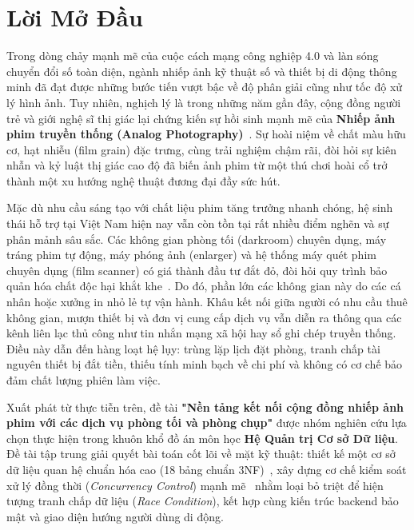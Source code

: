 \chapter*{Lời Mở Đầu}

Trong dòng chảy mạnh mẽ của cuộc cách mạng công nghiệp 4.0 và làn sóng chuyển đổi số toàn diện, ngành nhiếp ảnh kỹ thuật số và thiết bị di động thông minh đã đạt được những bước tiến vượt bậc về độ phân giải cũng như tốc độ xử lý hình ảnh. Tuy nhiên, nghịch lý là trong những năm gần đây, cộng đồng người trẻ và giới nghệ sĩ thị giác lại chứng kiến sự hồi sinh mạnh mẽ của \textbf{Nhiếp ảnh phim truyền thống (Analog Photography)}~\cite{edwards2023tactility}. Sự hoài niệm về chất màu hữu cơ, hạt nhiễu (film grain) đặc trưng, cùng trải nghiệm chậm rãi, đòi hỏi sự kiên nhẫn và kỷ luật thị giác cao độ đã biến ảnh phim từ một thú chơi hoài cổ trở thành một xu hướng nghệ thuật đương đại đầy sức hút.

Mặc dù nhu cầu sáng tạo với chất liệu phim tăng trưởng nhanh chóng, hệ sinh thái hỗ trợ tại Việt Nam hiện nay vẫn còn tồn tại rất nhiều điểm nghẽn và sự phân mảnh sâu sắc. Các không gian phòng tối (darkroom) chuyên dụng, máy tráng phim tự động, máy phóng ảnh (enlarger) và hệ thống máy quét phim chuyên dụng (film scanner) có giá thành đầu tư đắt đỏ, đòi hỏi quy trình bảo quản hóa chất độc hại khắt khe~\cite{rogers2023sustainable}. Do đó, phần lớn các không gian này do các cá nhân hoặc xưởng in nhỏ lẻ tự vận hành. Khâu kết nối giữa người có nhu cầu thuê không gian, mượn thiết bị và đơn vị cung cấp dịch vụ vẫn diễn ra thông qua các kênh liên lạc thủ công như tin nhắn mạng xã hội hay sổ ghi chép truyền thống. Điều này dẫn đến hàng loạt hệ lụy: trùng lặp lịch đặt phòng, tranh chấp tài nguyên thiết bị đắt tiền, thiếu tính minh bạch về chi phí và không có cơ chế bảo đảm chất lượng phiên làm việc.

Xuất phát từ thực tiễn trên, đề tài \textbf{"Nền tảng kết nối cộng đồng nhiếp ảnh phim với các dịch vụ phòng tối và phòng chụp"} được nhóm nghiên cứu lựa chọn thực hiện trong khuôn khổ đồ án môn học \textbf{Hệ Quản trị Cơ sở Dữ liệu}. Đề tài tập trung giải quyết bài toán cốt lõi về mặt kỹ thuật: thiết kế một cơ sở dữ liệu quan hệ chuẩn hóa cao (18 bảng chuẩn 3NF)~\cite{silberschatz2020database}, xây dựng cơ chế kiểm soát xử lý đồng thời (\textit{Concurrency Control}) mạnh mẽ~\cite{habibi2024towards, zhao2023efficiently} nhằm loại bỏ triệt để hiện tượng tranh chấp dữ liệu (\textit{Race Condition}), kết hợp cùng kiến trúc backend bảo mật và giao diện hướng người dùng di động.

